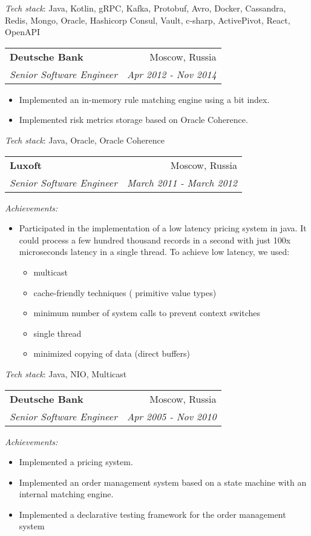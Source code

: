 \documentclass[letterpaper,11pt]{article}
\makeatletter
\newcommand{\resumeSubheading}[4]{
  \vspace{-1pt}\item
    \begin{tabular*}{0.97\textwidth}{l@{\extracolsep{\fill}}r}
      \textbf{#1} & #2 \\
      \textit{\small#3} & \textit{\small #4} \\
    \end{tabular*}\vspace{-5pt}
    \hspace{1em}%
}
\newcommand{\techStack}[1]{\textit{Tech stack}{:#1}}
\makeatother
\begin{document}
      \techStack{ Java, Kotlin, gRPC, Kafka, Protobuf, Avro, Docker, Cassandra, Redis, Mongo, Oracle, Hashicorp Consul, Vault, c-sharp, ActivePivot, React, OpenAPI}
      
    \resumeSubheading
      {Deutsche Bank}{Moscow, Russia}
      {Senior Software Engineer}{Apr 2012 - Nov 2014}      
      \begin{itemize}  
       \item Implemented an in-memory rule matching engine using a bit index.
       \item Implemented risk metrics storage based on Oracle Coherence.
      \end{itemize}

      \techStack{ Java, Oracle, Oracle Coherence}

    \resumeSubheading
      {Luxoft}{Moscow, Russia}
      {Senior Software Engineer}{March 2011 - March 2012}
      
      \textit{Achievements:}
      \begin{itemize}  
       \item Participated in the implementation of a low latency pricing system in java. It could process a few hundred thousand records in a second with just 100x microseconds latency in a single thread. To achieve low latency, we used:
       \begin{itemize}  
        \item multicast
        \item cache-friendly techniques ( primitive value types)
        \item minimum number of system calls to prevent context switches
        \item single thread
        \item minimized copying of data (direct buffers)
       \end{itemize}       
      \end{itemize}      
      \techStack{ Java, NIO, Multicast}
      
    \resumeSubheading
      {Deutsche Bank}{Moscow, Russia}
      {Senior Software Engineer}{Apr 2005 - Nov 2010}

      \textit{Achievements:}
      \begin{itemize}  
       \item Implemented a pricing system. 
       \item Implemented an order management system based on a state machine with an internal matching engine. 
       \item Implemented a declarative testing framework for the order management system
      \end{itemize}      
            
\end{document}
